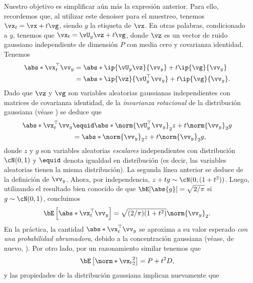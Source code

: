 \documentclass[../../book-main_es.tex]{subfiles}
\begin{document}
\begin{example}
    Nuestro objetivo es simplificar aún más la expresión anterior.
    Para ello, recordemos que, al utilizar este denoiser para el muestreo, tenemos
    $\vx_t = \vx + t \vg$, siendo $y$ la etiqueta de $\vx$.
    En otras palabras, condicionado a $y$, tenemos que $\vx_t = \vU_y \vz
    + t \vg$, donde $\vz$ es un vector de ruido gaussiano independiente de dimensión $P$
    con media cero y covarianza identidad.
    Tenemos
    \begin{align*}
        \abs*{\vx_t^\top \vv_y}
        &=
        \abs*{\ip{\vU_y \vz}{\vv_y} + t \ip{\vg}{\vv_y}}
        \\
        &=
        \abs*{\ip{\vz}{\vU_y^\top \vv_y} + t \ip{\vg}{\vv_y}}.
    \end{align*}
    Dado que $\vz$ y $\vg$ son variables aleatorias gaussianas independientes con
    matrices de covarianza identidad, de la \textit{invarianza rotacional}
    de la distribución gaussiana (véase \cite{Vershynin2018-br}) se deduce que
    \begin{align*}
        \abs*{\vx_t^\top \vv_y}
        &\equid
        \abs*{\norm{\vU_y^\top \vv_y}_2 z + t\norm{\vv_y}_2 g}
        \\
        &=
        \abs*{\norm{\vv_y}_2 z + t\norm{\vv_y}_2 g},
    \end{align*}
    donde $z$ y $g$ son variables aleatorias \textit{escalares} independientes con distribución $\cN(0, 1)$
    y $\equid$ denota igualdad en distribución (es decir, las variables aleatorias
    tienen la misma distribución).
    La segunda línea anterior se deduce de la definición de $\vv_y$.
    Ahora, por independencia, $z + tg \sim \cN(0, (1 + t^2))$.
    Luego, utilizando el resultado bien conocido de que $\bE[\abs{g}] = \sqrt{2/\pi}$ si $g
    \sim \cN(0, 1)$, concluimos
    \begin{equation*}
        \bE\left[
            \abs*{\vx_t^\top \vv_y}
        \right]
        =
        \sqrt{(2/\pi) (1 + t^2)} \norm{\vv_y}_2.
    \end{equation*}
    En la práctica, la cantidad $ \abs*{\vx_t^\top \vv_y}$ se aproxima a su
    valor esperado \textit{con una probabilidad abrumadora}, debido a la concentración gaussiana
    (véase, de nuevo, \cite{Vershynin2018-br}).
    Por otro lado, por un razonamiento similar tenemos que
    \begin{equation*}
        \bE\left[
            \norm*{\vx_t}_2^2
        \right]
        =
        P + t^2 D,
    \end{equation*}
    y las propiedades de la distribución gaussiana implican nuevamente que

\end{example}
\end{document}
